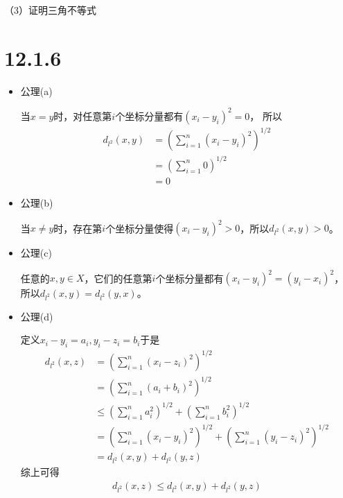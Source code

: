 \documentclass{article}
\begin{document}
（3）证明三角不等式




\section*{12.1.6}

\begin{itemize}
      \item 公理(a)

            当$x = y$时，对任意第$i$个坐标分量都有$(x_i - y_i)^2 = 0$， 所以
            \begin{align*}
                  d_{l^2}(x, y) & = \left(\sum\limits_{i=1}^n (x_i - y_i)^2\right)^{1/2} \\
                                & = \left(\sum\limits_{i=1}^n 0 \right)^{1/2}            \\
                                & = 0
            \end{align*}
      \item 公理(b)

            当$x \neq y$时，存在第$i$个坐标分量使得$(x_i - y_i)^2 > 0$，所以$d_{l^2}(x, y) > 0$。

      \item 公理(c)

            任意的$x, y \in X$，它们的任意第$i$个坐标分量都有$(x_i - y_i)^2 = (y_i - x_i)^2$，所以$d_{l^2}(x, y) = d_{l^2}(y, x)$。

      \item 公理(d)

            定义$x_i - y_i = a_i, y_i - z_i = b_i$于是
            \begin{align*}
                  d_{l^2}(x, z) & = \left(\sum\limits_{i=1}^n (x_i - z_i)^2\right)^{1/2}                                                        \\
                                & = \left(\sum\limits_{i=1}^n (a_i + b_i)^2\right)^{1/2}                                                        \\
                                & \leq \left(\sum\limits_{i=1}^n a_i^2\right)^{1/2} + \left(\sum\limits_{i=1}^n b_i^2\right)^{1/2}              \\
                                & = \left(\sum\limits_{i=1}^n (x_i - y_i)^2\right)^{1/2} + \left(\sum\limits_{i=1}^n (y_i - z_i)^2\right)^{1/2} \\
                                & = d_{l^2}(x, y) + d_{l^2}(y, z)
            \end{align*}
            综上可得
            \begin{align*}
                  d_{l^2}(x, z) \leq d_{l^2}(x, y) + d_{l^2}(y, z)
            \end{align*}

\end{itemize}
\end{document}
